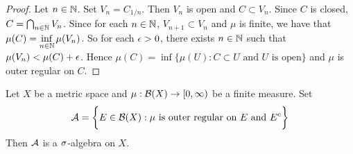 \documentclass{book}
\begin{document}
	\begin{proof}
		Let $n \in \mathbb{N}$. Set $V_n = C_{1/n}$. Then $V_n$ is open and $C \subset V_n$. Since $C$ is closed, $C = \bigcap_{n \in \mathbb{N}} V_n$. Since for each $n \in \mathbb{N}$, $V_{n+1} \subset V_n$ and $\mu$ is finite, we have that $\mu(C) = \inf\limits_{n \in \mathbb{N}} \mu(V_n)$. So for each $\epsilon >0$, there exists $n \in \mathbb{N}$ such that $\mu(V_n) < \mu(C) + \epsilon$. Hence $\mu(C) = \inf \{\mu(U): C \subset U \text{ and $U$ is open} \}$ and $\mu$ is outer regular on $C$.    
	\end{proof}
	
	\begin{ex}
		Let $X$ be a metric space and $\mu: \mathcal{B}(X) \rightarrow [0,\infty)$ be a finite measure. Set 
		$$\mathcal{A} = \bigg \{E \in \mathcal{B}(X): \text{$\mu$ is outer regular on $E$ and $E^c$} \bigg\}$$  
		Then $\mathcal{A}$ is a $\sigma$-algebra on $X$.
	\end{ex}	
\end{document}
